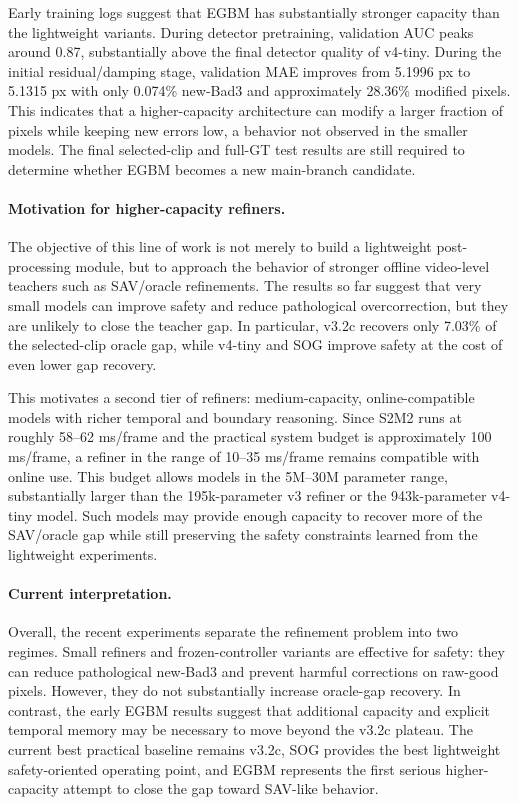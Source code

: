 \documentclass[11pt,a4paper]{article}
\begin{document}
Early training logs suggest that EGBM has substantially stronger capacity than
the lightweight variants. During detector pretraining, validation AUC peaks
around 0.87, substantially above the final detector quality of v4-tiny. During
the initial residual/damping stage, validation MAE improves from 5.1996 px to
5.1315 px with only 0.074\% new-Bad3 and approximately 28.36\% modified pixels.
This indicates that a higher-capacity architecture can modify a larger fraction
of pixels while keeping new errors low, a behavior not observed in the smaller
models. The final selected-clip and full-GT test results are still required to
determine whether EGBM becomes a new main-branch candidate.

\paragraph{Motivation for higher-capacity refiners.}
The objective of this line of work is not merely to build a lightweight
post-processing module, but to approach the behavior of stronger offline
video-level teachers such as SAV/oracle refinements. The results so far suggest
that very small models can improve safety and reduce pathological
overcorrection, but they are unlikely to close the teacher gap. In particular,
v3.2c recovers only 7.03\% of the selected-clip oracle gap, while v4-tiny and SOG
improve safety at the cost of even lower gap recovery.

This motivates a second tier of refiners: medium-capacity, online-compatible
models with richer temporal and boundary reasoning. Since S2M2 runs at roughly
58--62 ms/frame and the practical system budget is approximately 100 ms/frame, a
refiner in the range of 10--35 ms/frame remains compatible with online use. This
budget allows models in the 5M--30M parameter range, substantially larger than
the 195k-parameter v3 refiner or the 943k-parameter v4-tiny model. Such models
may provide enough capacity to recover more of the SAV/oracle gap while still
preserving the safety constraints learned from the lightweight experiments.

\paragraph{Current interpretation.}
Overall, the recent experiments separate the refinement problem into two regimes.
Small refiners and frozen-controller variants are effective for safety: they can
reduce pathological new-Bad3 and prevent harmful corrections on raw-good pixels.
However, they do not substantially increase oracle-gap recovery. In contrast,
the early EGBM results suggest that additional capacity and explicit temporal
memory may be necessary to move beyond the v3.2c plateau. The current best
practical baseline remains v3.2c, SOG provides the best lightweight
safety-oriented operating point, and EGBM represents the first serious
higher-capacity attempt to close the gap toward SAV-like behavior.
\end{document}
